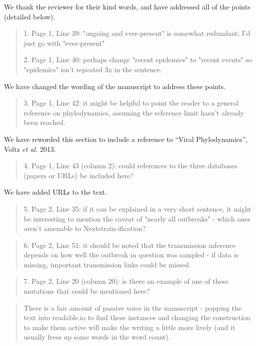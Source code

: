 \documentclass[12pt,a4paper]{article}
\begin{document}
We thank the reviewer for their kind words, and have addressed all of the points (detailed below).

\begin{quote}
1. Page 1, Line 39: "ongoing and ever-present" is somewhat redundant; I'd just go with "ever-present"

2. Page 1, Line 40: perhaps change "recent epidemics" to "recent events" so "epidemics" isn't repeated 3x in the sentence.
\end{quote}

We have changed the wording of the manuscript to address these points. 

\begin{quote}
3. Page 1, Line 42: it might be helpful to point the reader to a general reference on phylodynamics, assuming the reference limit hasn't already been reached.
\end{quote}
We have reworded this section to include a reference to ``Viral Phylodynamics'', Voltz \textit{et al.} 2013.

\begin{quote}
4. Page 1, Line 43 (column 2): could references to the three databases (papers or URLs) be included here?
\end{quote}
We have added URLs to the text.

\begin{quote}
5. Page 2, Line 35: if it can be explained in a very short sentence, it might be interesting to mention the caveat of "nearly all outbreaks" - which ones aren't amenable to Nextstrain-ification?
\end{quote}


\begin{quote}
6. Page 2, Line 51: it should be noted that the transmission inference depends on how well the outbreak in question was sampled - if data is missing, important transmission links could be missed.
\end{quote}


\begin{quote}
7. Page 2, Line 20 (column 20): is there an example of one of these mutations that could be mentioned here?
\end{quote}


\begin{quote}
There is a fair amount of passive voice in the manuscript - popping the text into readable.io to find these instances and changing the construction to make them active will make the writing a little more lively (and it usually frees up some words in the word count).

\end{quote}
\end{document}
